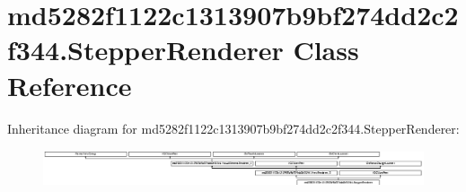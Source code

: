 \hypertarget{classmd5282f1122c1313907b9bf274dd2c2f344_1_1StepperRenderer}{}\section{md5282f1122c1313907b9bf274dd2c2f344.\+Stepper\+Renderer Class Reference}
\label{classmd5282f1122c1313907b9bf274dd2c2f344_1_1StepperRenderer}
Inheritance diagram for md5282f1122c1313907b9bf274dd2c2f344.\+Stepper\+Renderer\+:\begin{figure}[H]
\begin{center}
\leavevmode
\includegraphics[height=1.098039cm]{classmd5282f1122c1313907b9bf274dd2c2f344_1_1StepperRenderer}
\end{center}
\end{figure}
